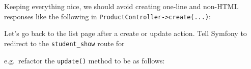 \documentclass[a4paperpaper,openright]{book}
\newenvironment{Shaded}{}{}
\newcommand{\KeywordTok}[1]{\textcolor[rgb]{0.00,0.44,0.13}{\textbf{#1}}}
\newcommand{\NormalTok}[1]{#1}
\newcommand{\OtherTok}[1]{\textcolor[rgb]{0.00,0.44,0.13}{#1}}
\newcommand{\StringTok}[1]{\textcolor[rgb]{0.25,0.44,0.63}{#1}}
\begin{document}
Keeping everything nice, we should avoid creating one-line and non-HTML
responses like the following in
\texttt{ProductController-\textgreater{}create(...)}:

\begin{Shaded}
\end{Shaded}

Let's go back to the list page after a create or update action. Tell
Symfony to redirect to the \texttt{student\_show} route for

\begin{Shaded}
\end{Shaded}

e.g.~refactor the \texttt{update()} method to be as follows:
\end{document}
